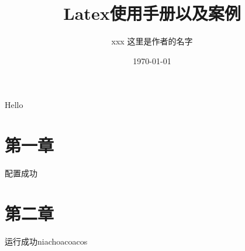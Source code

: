 \documentclass{ctexart}
\title{Latex使用手册以及案例}
\author{ xxx 这里是作者的名字}
\date{\today}
\begin{document}
\maketitle
Hello
\section{第一章}
配置成功
\section{第二章}
运行成功niachoacoacos
\end{document}
